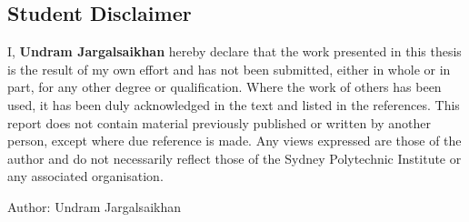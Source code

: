 \subsection*{Student Disclaimer}

I, \textbf{Undram Jargalsaikhan} hereby declare that the work presented in this thesis is the result of my own effort and has not been submitted, either in whole or in part, for any other degree or qualification. Where the work of others has been used, it has been duly acknowledged in the text and listed in the references. This report does not contain material previously published or written by another person, except where due reference is made. Any views expressed are those of the author and do not necessarily reflect those of the Sydney Polytechnic Institute or any associated organisation.

\begin{flushright}
\vspace{10pt}
Author: Undram Jargalsaikhan
\end{flushright}


